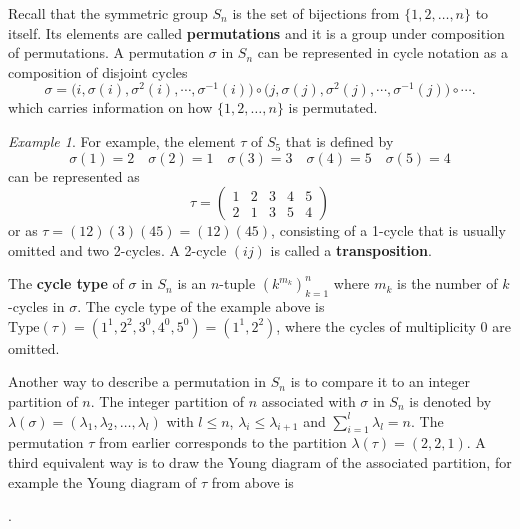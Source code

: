 \documentclass[12pt, a4paper, twoside]{article}
\newcommand{\1}{\mathbf{1}}
\theoremstyle{definition}
\theoremstyle{plain}
\theoremstyle{remark}
\newtheorem{example}[definition]{Example}
\begin{document}
	Recall that the symmetric group $S_n$ is the set of bijections from $\{ 1, 2, \dots, n\}$ to itself. Its elements are called \textbf{permutations} and it is a group under composition of permutations. A permutation $\sigma$ in $S_n$ can be represented 
	in cycle notation as a composition of disjoint cycles
	\[
	\sigma = \big( i, \sigma(i), \sigma^2(i), \cdots, \sigma^{-1}(i) \big) \circ \big( j, \sigma(j), \sigma^2(j), \cdots, \sigma^{-1}(j) \big) \circ \cdots.
	\]
	which carries information on how $\{1,2,\dots,n\}$ is permutated. \begin{example}
		For example, the element $\tau$ of $S_5$ that is defined by 
		\[
		\sigma(1) = 2 \quad \sigma(2) = 1 \quad \sigma(3) = 3 \quad \sigma(4) = 5 \quad \sigma(5) = 4
		\]
		can be represented as 
		\[ 
		\tau = 
		\begin{pmatrix}
			1 & 2 & 3 & 4 & 5 \\
			2 & 1 & 3 & 5 & 4
		\end{pmatrix}
		\]
		or as $\tau = (12)(3)(45) = (12)(45)$, consisting of a 1-cycle that is usually omitted and two 2-cycles. A 2-cycle $(ij)$ is called a \textbf{transposition}.
	\end{example}
	
	The \textbf{cycle type} of $\sigma$ in $S_n$ is an $n$-tuple $(k^{m_k})_{k=1}^n$ where $m_k$ is the number of $k$-cycles in $\sigma$. The cycle type of the example above is $\text{Type}(\tau) = (1^1,2^2,3^0,4^0,5^0) = (1^1,2^2)$, where the cycles of multiplicity 0 are omitted.
	
	Another way to describe a permutation in $S_n$ is to compare it to an integer partition of $n$. The integer partition of $n$ associated with $\sigma$ in $S_n$ is denoted by $\lambda(\sigma) = ( \lambda_1, \lambda_2, \dots, \lambda_l)$ with $l \leq n$, $\lambda_i \leq \lambda_{i+1}$ and $\sum_{i=1}^l \lambda_l = n$. The permutation $\tau$ from earlier corresponds to the partition $\lambda(\tau) = (2, 2, 1)$. 
	A third equivalent way is to draw the Young diagram of the associated partition, for example the Young diagram of $\tau$ from above is 
	\begin{table}[hbt!]
		\centering
		.
	\end{table}
	
\end{document}
